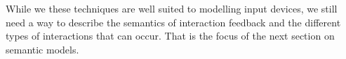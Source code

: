% 
% 
% 
% 
% 
% 	

While we these techniques are well suited to modelling input devices, we still need a way to describe the semantics of interaction feedback and the different types of interactions that can occur. That is the focus of the next section on semantic models.	

